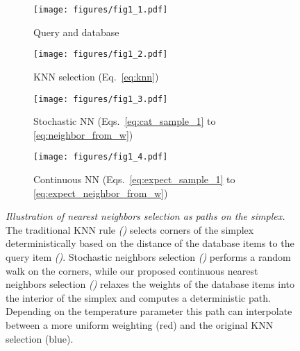 \documentclass{article}
\begin{document}
 \begin{figure*}[t]
\begin{center}
\begin{subfigure}[b]{0.18\textwidth}
	\centering
	\texttt{[image: figures/fig1\_1.pdf]}
	\caption{Query and database}
	\label{fig:fig1_query_db}
	\end{subfigure}
	\hfill
	\begin{subfigure}[b]{0.26\textwidth}
	{\texttt{[image: figures/fig1\_2.pdf]}}
	\caption{KNN selection (Eq.~\ref{eq:knn})}
	\label{fig:fig1_knn}
	\end{subfigure}
	\hfill
	\begin{subfigure}[b]{0.26\textwidth}
	\texttt{[image: figures/fig1\_3.pdf]}
	\caption{Stochastic NN (Eqs.~\ref{eq:cat_sample_1} to \ref{eq:neighbor_from_w})}
	\label{fig:fig1_snn}
	\end{subfigure}
	\hfill
	\begin{subfigure}[b]{0.26\textwidth}
	\texttt{[image: figures/fig1\_4.pdf]}
	\caption{Continuous NN (Eqs.~\ref{eq:expect_sample_1} to \ref{eq:expect_neighbor_from_w})}
	\label{fig:fig1_cnn}
	\end{subfigure}
\end{center}
   \caption{\emph{Illustration of nearest neighbors selection as paths on the simplex.} 
   The traditional KNN rule \emph{()} selects corners of the simplex deterministically based on the distance of the database items  to the query item  \emph{()}.
   Stochastic neighbors selection \emph{()} performs a random walk on the corners, while our proposed continuous nearest neighbors selection \emph{()} relaxes the weights of the database items into the interior of the simplex and computes a deterministic path. 
   Depending on the temperature parameter this path can interpolate between a more uniform weighting (red) and the original KNN selection (blue).}
\label{fig:fig1}
\vspace{-0.5em}
\end{figure*}
\end{document}

